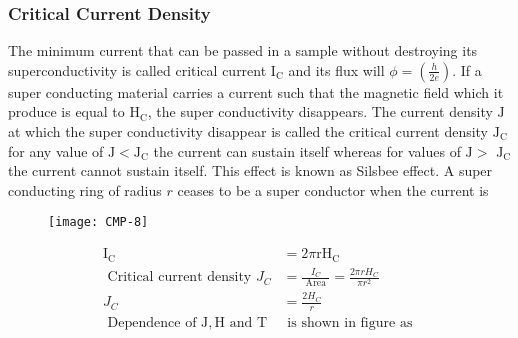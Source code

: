 \subsubsection{Critical Current Density}
The minimum current that can be passed in a sample without destroying its superconductivity is called critical current $\mathrm{I}_{\mathrm{C}}$ and its flux will $\phi=\left(\frac{h}{2 e}\right)$. If a super conducting material carries a current such that the magnetic field which it produce is equal to $\mathrm{H}_{\mathrm{C}}$, the super conductivity disappears. The current density $\mathrm{J}$ at which the super conductivity disappear is called the critical current density $\mathrm{J}_{\mathrm{C}}$ for any value of $\mathrm{J}<\mathrm{J}_{\mathrm{C}}$ the current can sustain itself whereas for values of $\mathrm{J}>$ $\mathrm{J}_{\mathrm{C}}$ the current cannot sustain itself. This effect is known as Silsbee effect.
A super conducting ring of radius $r$ ceases to be a super conductor when the current is
\begin{figure}[H]
	\centering
	\texttt{[image: CMP-8]}
	\caption{}
	\label{}
\end{figure}
\begin{align*}
\mathrm{I}_{\mathrm{C}}&=2 \pi \mathrm{rH}_{\mathrm{C}}\\
\text { Critical current density } J_{C}&=\frac{I_{C}}{\text { Area }}=\frac{2 \pi r H_{C}}{\pi r^{2}}\\
J_{C}&=\frac{2 H_{C}}{r}\\
\text { Dependence of } \mathrm{J}, \mathrm{H} \text { and } \mathrm{T} &\text { is shown in figure as }
\end{align*}
